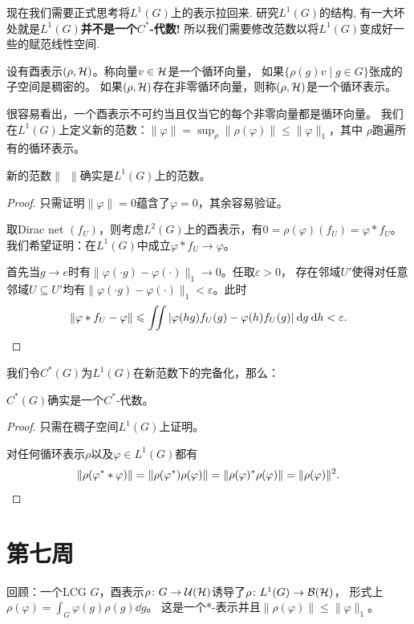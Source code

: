 现在我们需要正式思考将$L^1(G)$上的表示拉回来. 研究$L^1(G)$的结构, 有一大坏处就是$L^1(G)$\textbf{并不是一个$C^*$-代数!} 所以我们需要修改范数以将$L^1(G)$变成好一些的赋范线性空间.
\begin{definition}
    设有酉表示$(\rho,\mathcal{H})$。称向量$v \in \mathcal{H}$是一个循环向量，
    如果$\{\rho(g)v\mid g \in G\}$张成的子空间是稠密的。
    如果$(\rho,\mathcal{H})$存在非零循环向量，则称$(\rho,\mathcal{H})$是一个循环表示。
\end{definition}
很容易看出，一个酉表示不可约当且仅当它的每个非零向量都是循环向量。
我们在$L^1(G)$上定义新的范数：$\|\varphi\| = \sup_\rho \|\rho(\varphi)\| \leqslant \|\varphi\|_1$，其中
$\rho$跑遍所有的循环表示。
\begin{lemma}
    新的范数$\|\ \ \|$确实是$L^1(G)$上的范数。
\end{lemma}
\begin{proof}
    只需证明$\|\varphi\| = 0$蕴含了$\varphi = 0$，其余容易验证。

    取Dirac net $(f_U)$，则考虑$L^2(G)$上的酉表示，有$0 = \rho(\varphi)(f_U) = \varphi * f_U$。
    我们希望证明：在$L^1(G)$中成立$\varphi * f_U \to \varphi$。

    首先当$g \to e$时有$\|\varphi(\cdot g)-\varphi(\cdot)\|_1 \to 0$。任取$\varepsilon > 0$，
    存在邻域$U'$使得对任意邻域$U \subseteq U'$均有$\|\varphi(\cdot g)-\varphi(\cdot)\|_1 < \varepsilon$。此时
    \[\|\varphi * f_U -\varphi\| \leqslant \iint |\varphi(hg)f_U(g)-\varphi(h)f_U(g)|\:\mathrm{d} g\:\mathrm{d} h < \varepsilon.\qedhere\]
\end{proof}

我们令$C^*(G)$为$L^1(G)$在新范数下的完备化，那么：
\begin{proposition}
$C^*(G)$确实是一个$C^*$-代数。
\end{proposition}
\begin{proof}
    只需在稠子空间$L^1(G)$上证明。
    
    对任何循环表示$\rho$以及$\varphi \in L^1(G)$都有
    \[\|\rho(\varphi^* * \varphi)\| = \|\rho(\varphi^*)\rho(\varphi)\| 
    = \|\rho(\varphi)^*\rho(\varphi)\| = \|\rho(\varphi)\|^2.\qedhere\]
\end{proof}

\section{第七周}
回顾：一个LCG $G$，酉表示$\rho \colon G \to \mathcal{U}(\mathcal{H})$诱导了$\rho \colon L^1(G) \to \mathcal{B}(\mathcal{H})$，
形式上$\displaystyle \rho(\varphi) = \int_G \varphi(g)\rho(g)\dd g$。
这是一个*-表示并且$\|\rho(\varphi)\| \leqslant \|\varphi\|_1$。

